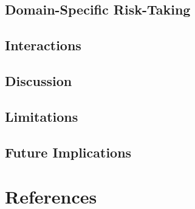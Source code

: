 \documentclass[
  donotrepeattitle,doc, 12pt, a4paper,floatsintext]{apa7}
\begin{document}
\hypertarget{domain-specific-risk-taking}{%
\subsection{Domain-Specific Risk-Taking}\label{domain-specific-risk-taking}}

\hypertarget{interactions}{%
\subsection{Interactions}\label{interactions}}

\hypertarget{discussion}{%
\subsection{Discussion}\label{discussion}}

\hypertarget{limitations}{%
\subsection{Limitations}\label{limitations}}

\hypertarget{future-implications}{%
\subsection{Future Implications}\label{future-implications}}

\newpage

\hypertarget{references}{%
\section{References}\label{references}}

\begingroup
\setlength{\parindent}{-0.5in}
\setlength{\leftskip}{0.5in}
\end{document}
